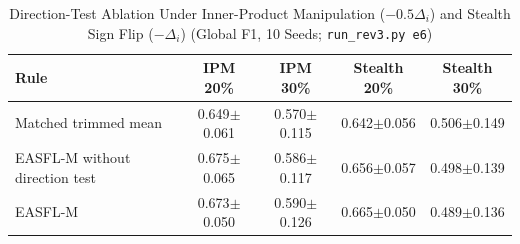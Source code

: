 \documentclass[journal,onecolumn]{IEEEtran}
\begin{document}
\begin{table}[h]\caption{Direction-Test Ablation Under Inner-Product Manipulation ($-0.5\Delta_i$) and Stealth Sign Flip ($-\Delta_i$) (Global F1, 10 Seeds; \texttt{run\_rev3.py e6})}\centering\small
\begin{tabular}{@{}lcccc@{}}\toprule Rule & IPM 20\% & IPM 30\% & Stealth 20\% & Stealth 30\%\\\midrule
Matched trimmed mean & 0.649$\pm$0.061 & 0.570$\pm$0.115 & 0.642$\pm$0.056 & 0.506$\pm$0.149\\
EASFL-M without direction test & 0.675$\pm$0.065 & 0.586$\pm$0.117 & 0.656$\pm$0.057 & 0.498$\pm$0.139\\
EASFL-M & 0.673$\pm$0.050 & 0.590$\pm$0.126 & 0.665$\pm$0.050 & 0.489$\pm$0.136\\
\bottomrule\end{tabular}\end{table}
\clearpage

\end{document}
